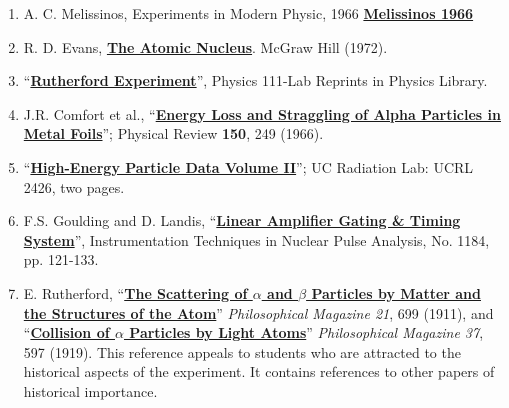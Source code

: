 \documentclass{../lab}
\begin{document}
\begin{enumerate}
    \item A. C. Melissinos, Experiments in Modern Physic, 1966 \href{http://physics111.lib.berkeley.edu/Physics111/Reprints/RUT/RUT\%20\%20melissinos\%201966\%20rutherford\%20scattering.pdf}{\textbf{Melissinos 1966}}

    \item R. D. Evans, \href{http://physics111.lib.berkeley.edu/Physics111/Reprints/R.D.Evans\%20Atomic\%20Nucleus/The\%20Atomic\%20Nucleus\%20Evans\%20full\%20text.pdf}{\textbf{The Atomic Nucleus}}. McGraw Hill (1972).

    \item ``\href{http://physics111.lib.berkeley.edu/Physics111/Reprints/RUT/03-Physics\_111\_Rutherford\_Scattering\_Experiment.pdf}{\textbf{Rutherford Experiment}}'', Physics 111-Lab Reprints in Physics Library.

    \item J.R. Comfort et al., ``\href{http://physics111.lib.berkeley.edu/Physics111/Reprints/RUT/01-Energy\_Loss\_and\_Straggling.pdf}{\textbf{Energy Loss and Straggling of Alpha Particles in Metal Foils}}''; Physical Review \textbf{150}, 249 (1966). 

    \item ``\href{http://physics111.lib.berkeley.edu/Physics111/Reprints/RUT/02-High\_Energy\_Particle\_Data.pdf}{\textbf{High-Energy Particle Data Volume II}}''; UC Radiation Lab: UCRL 2426, two pages.

    \item F.S. Goulding and D. Landis, ``\href{http://physics111.lib.berkeley.edu/Physics111/Reprints/RUT/04-Linear\_Amplifier.pdf}{\textbf{Linear Amplifier Gating \& Timing System}}'', Instrumentation Techniques in Nuclear Pulse Analysis, No. 1184, pp. 121-133.

    \item E. Rutherford, ``\href{http://physics111.lib.berkeley.edu/Physics111/Reprints/RUT/The_Scattering_of_Alpha_and_Beta_Particles_By_Matter_and_the_Structures_of_the_Atom.pdf}{\textbf{The Scattering of $ \alpha $ and $ \beta $ Particles by Matter and the Structures of the Atom}}'' \emph{Philosophical Magazine 21}, 699 (1911), and ``\href{http://physics111.lib.berkeley.edu/Physics111/Reprints/RUT/Collision_of_Particles_by_Light_Atoms.pdf}{\textbf{Collision of $ \alpha $ Particles by Light Atoms}}'' \emph{Philosophical Magazine 37}, 597 (1919). This reference appeals to students who are attracted to the historical aspects of the experiment. It contains references to other papers of historical importance.

\end{enumerate}
\end{document}
